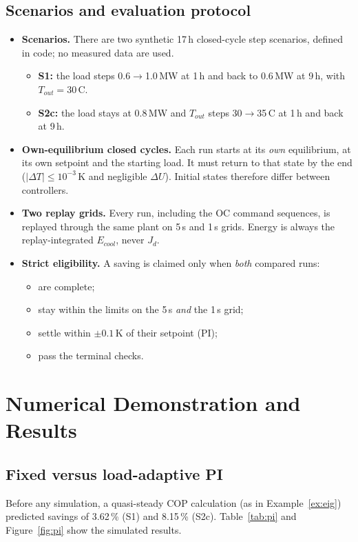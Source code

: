 \documentclass[12pt,a4paper]{report}
\theoremstyle{definition}
\begin{document}
\subsection*{Scenarios and evaluation protocol}
\begin{itemize}
\item \textbf{Scenarios.} There are two synthetic 17\,h closed-cycle step scenarios, defined in code; no measured data are used.
\begin{itemize}
\item \textbf{S1:} the load steps 0.6$\to$1.0\,MW at 1\,h and back to 0.6\,MW at 9\,h, with $T_{out}=30$\,\textdegree C.
\item \textbf{S2c:} the load stays at 0.8\,MW and $T_{out}$ steps 30$\to$35\,\textdegree C at 1\,h and back at 9\,h.
\end{itemize}
\item \textbf{Own-equilibrium closed cycles.} Each run starts at its \emph{own} equilibrium, at its own setpoint and the starting load. It must return to that state by the end ($|\Delta T|\le10^{-3}$\,K and negligible $\Delta U$). Initial states therefore differ between controllers.
\item \textbf{Two replay grids.} Every run, including the OC command sequences, is replayed through the same plant on 5\,s and 1\,s grids. Energy is always the replay-integrated $E_{cool}$, never $J_d$.
\item \textbf{Strict eligibility.} A saving is claimed only when \emph{both} compared runs:
\begin{itemize}
\item are complete;
\item stay within the limits on the 5\,s \emph{and} the 1\,s grid;
\item settle within $\pm0.1$\,K of their setpoint (PI);
\item pass the terminal checks.
\end{itemize}
\end{itemize}

\section{Numerical Demonstration and Results}

\subsection*{Fixed versus load-adaptive PI}
Before any simulation, a quasi-steady COP calculation (as in Example~\ref{ex:eig}) predicted savings of 3.62\,\% (S1) and 8.15\,\% (S2c). Table~\ref{tab:pi} and Figure~\ref{fig:pi} show the simulated results.
\end{document}
